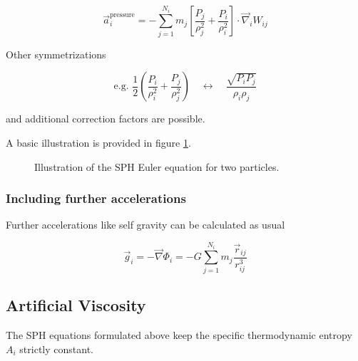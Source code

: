 \begin{equation}
    \boxed{\vec{a}_i^{\text{pressure}} = -\sum_{j=1}^{N_i} m_j\left[\frac{P_j}{\rho_j^2}+\frac{P_i}{\rho_i^2}\right] \cdot \vec{\nabla}_i W_{i j}}
\end{equation}




Other symmetrizations

\begin{equation}
    \text{e.g. } \frac{1}{2} \left( \frac{P_i}{\rho_i^2} + \frac{P_j}{\rho_j^2} \right) \quad \leftrightarrow \quad \frac{\sqrt{P_i P_j}}{\rho_i \rho_j} 
\end{equation}

and additional correction factors are possible.

A basic illustration is provided in figure \ref{fig:sph_2particles}.

\begin{figure}[!htb]
 \centering
 \hfill
 \caption{Illustration of the SPH Euler equation for two particles.}
 \label{fig:sph_2particles}
\end{figure}

\subsubsection{Including further accelerations}
Further accelerations like self gravity can be calculated as usual

\begin{equation}
    \vec{g}_i = -\vec{\nabla} \Phi_i = - G \sum_{j=1}^{N_i} m_j \frac{\vec{r}_{i j}}{r_{i j}^3}
\end{equation}

\subsection{Artificial Viscosity}
The SPH equations formulated above keep the specific thermodynamic entropy $A_i$ strictly constant.
 
